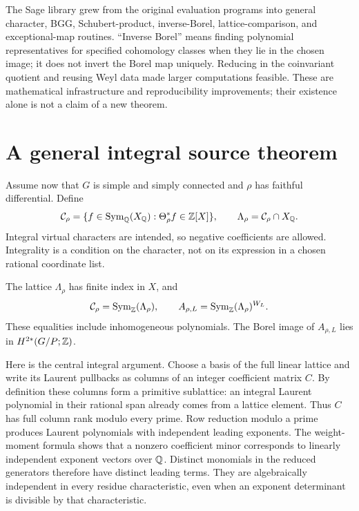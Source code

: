 The Sage library grew from the original evaluation programs into general character, BGG, Schubert-product, inverse-Borel, lattice-comparison, and exceptional-map routines. ``Inverse Borel'' means finding polynomial representatives for specified cohomology classes when they lie in the chosen image; it does not invert the Borel map uniquely. Reducing in the coinvariant quotient and reusing Weyl data made larger computations feasible. These are mathematical infrastructure and reproducibility improvements; their existence alone is not a claim of a new theorem.


\section{A general integral source theorem}
Assume now that $G$ is simple and simply connected and $\rho$ has faithful differential. Define
\[
 \mathcal C_\rho=\{f\in\operatorname{Sym}_\mathbb Q(X_\mathbb Q):\Theta_\rho^*f\in\mathbb Z[X]\},\qquad
 \Lambda_\rho=\mathcal C_\rho\cap X_\mathbb Q.
\]
Integral virtual characters are intended, so negative coefficients are allowed. Integrality is a condition on the character, not on its expression in a chosen rational coordinate list.

\begin{theorem}
The lattice $\Lambda_\rho$ has finite index in $X$, and
\[
 \mathcal C_\rho=\operatorname{Sym}_\mathbb Z(\Lambda_\rho),\qquad
 A_{\rho,L}=\operatorname{Sym}_\mathbb Z(\Lambda_\rho)^{W_L}.
\]
These equalities include inhomogeneous polynomials. The Borel image of $A_{\rho,L}$ lies in $H^{2*}(G/P;\mathbb Z)$.
\end{theorem}

Here is the central integral argument. Choose a basis of the full linear lattice and write its Laurent pullbacks as columns of an integer coefficient matrix $C$. By definition these columns form a primitive sublattice: an integral Laurent polynomial in their rational span already comes from a lattice element. Thus $C$ has full column rank modulo every prime. Row reduction modulo a prime produces Laurent polynomials with independent leading exponents. The weight-moment formula shows that a nonzero coefficient minor corresponds to linearly independent exponent vectors over $\mathbb Q$. Distinct monomials in the reduced generators therefore have distinct leading terms. They are algebraically independent in every residue characteristic, even when an exponent determinant is divisible by that characteristic.

